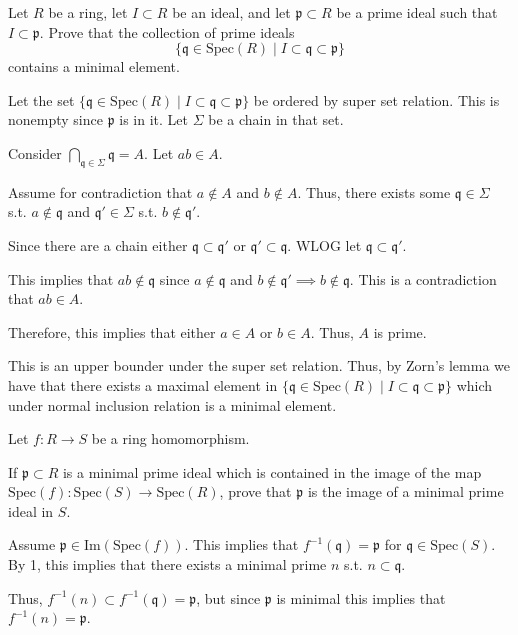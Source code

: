 \documentclass[12pt, letterpaper]{article}
\newcommand{\p}{\mathfrak{p}}
\newcommand{\Spec}{\mathrm{Spec}}
\newcommand{\mf}[1]{\mathfrak{#1}}
\begin{document}
\color{\TextColor}
\pagecolor{\colormode}
\setlength{\parindent}{0pt}
\pagestyle{fancy}
\fancyhf{}

\begin{problem}{}
    Let $R$ be a ring, let $I \subset R$ be an ideal, and let $\p \subset R$ be a prime ideal such that $I \subset \p$.
Prove that the collection of prime ideals
\[\{\mf{q} \in \Spec(R) \mid I \subset \mf{q} \subset \p\}\]
contains a minimal element.
\end{problem}
\begin{problemproof}
    Let the set $\{\mf{q} \in \Spec(R) \mid I \subset \mf{q} \subset \p\}$ be ordered by super set relation. This is nonempty since $\p$ is in it. 
    Let $\Sigma$ be a chain in that set.

    Consider $\bigcap_{\mf{q} \in \Sigma} \mf{q}=A$. Let $ab \in A$.

    Assume for contradiction that $a \notin A$ and $b \notin A$. Thus, there exists some $\mf{q} \in \Sigma$ s.t. $a \notin \mf{q}$ and $\mf{q}' \in \Sigma$ s.t. $b \notin \mf{q}'$.

    Since there are a chain either $\mf{q} \subset \mf{q}'$ or $\mf{q}' \subset \mf{q}$. WLOG let $\mf{q} \subset \mf{q}'$.

    This implies that $ab \notin \mf{q}$ since $a \notin \mf{q}$ and $b \notin \mf{q}' \implies b \notin \mf{q}$. This is a contradiction that $ab \in A$.

    Therefore, this implies that either $a \in A$ or $b \in A$. Thus, $A$ is prime.

    This is an upper bounder under the super set relation. Thus, by Zorn's lemma we have that there exists a maximal element in $\{\mf{q} \in \Spec(R) \mid I \subset \mf{q} \subset \p\}$
    which under normal inclusion relation is a minimal element.
\end{problemproof}

\begin{problem}{}
    Let $f : R \to S$ be a ring homomorphism.
\end{problem}
\begin{subproblem}{}
    If $\p \subset R$ is a minimal prime ideal which is contained in the image of the map
$\Spec(f ) : \Spec(S) \to \Spec(R)$, prove that $\p$ is the image of a minimal prime ideal
in $S$.
\end{subproblem}
\begin{problemproof}
    Assume $\p \in \mathrm{Im}(\Spec(f))$. This implies that $f^{-1}(\mf{q})=\p$ for $\mf{q} \in \Spec(S)$.
    By 1, this implies that there exists a minimal prime $n$ s.t. $n \subset \mf{q}$.

    Thus, $f^{-1}(n) \subset f^{-1}(\mf{q})=\p$, but since $\p$ is minimal this implies that $f^{-1}(n)=\p$.
\end{problemproof}
\end{document}
